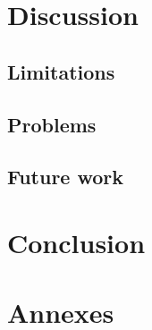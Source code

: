\documentclass[a4paper]{article}
\begin{document}
	
	\section{Discussion}
	
	\subsection{Limitations}
	
	
	\subsection{Problems}
	
	\subsection{Future work}

	\section{Conclusion}	
	
	
	
	
	
	
	
	
	
	\section{Annexes}
	
	
	
\end{document}
